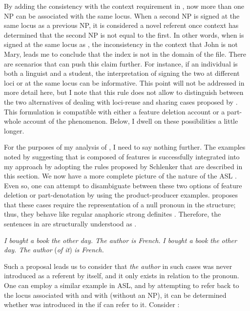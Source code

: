 \documentclass[output=paper,
modfonts
]{langscibook}
\begin{document}
By adding the consistency with the context requirement in , now more than one NP can be associated with the same locus. When a second NP is signed at the same locus as a previous NP, it is considered a novel referent once context has determined that the second NP is not equal to the first. In other words, when  is signed at the same locus as , the inconsistency in the context that John is not Mary, leads me to conclude that the index is not in the domain of the file. There are scenarios that can push this claim further. For instance, if an individual is both a linguist and a student, the interpretation of signing the two at different loci or at the same locus can be informative. This point will not be addressed in more detail here, but I note that this rule does not allow to distinguish between the two alternatives of dealing with loci-reuse and sharing cases proposed by \citeauthor{Schlenker2014}. This formulation is compatible with either a feature deletion account or a part-whole account of the phenomenon. Below, I dwell on these possibilities a little longer. 

For the purposes of my analysis of , I need to say nothing further. The examples noted by \citeauthor{Kuhn2015} suggesting that  is composed of features is successfully integrated into my approach by adopting the rules proposed by Schlenker that are described in this section. We now have a more complete picture of the nature of the ASL . Even so, one can attempt to disambiguate between these two options of feature deletion or part-denotation by using the product-producer  examples. \citet{Schwarz2009} proposes that these cases require the representation of a null pronoun in the structure; thus, they behave like regular anaphoric strong definites \citep[268]{Schwarz2009}. Therefore, the sentences in  are structurally understood as . 

\begin{exe}
	\ex 
	\begin{xlist} 
		\ex \label{ex:irani:81a} \textit{I bought a book the other day. The author is French.}
		\ex \label{ex:irani81b} \textit{I bought a book the other day. The author} (\textit{of it}) \textit{is French.}
	\end{xlist} 
\end{exe}

Such a proposal leads us to consider that \textit{the author} in such cases was never introduced as a referent by itself, and it only exists in relation to the pronoun. One can employ a similar example in ASL, and by attempting to refer back to the locus associated with  and  with  (without an NP), it can be determined whether  was introduced in the  if  can refer to it. Consider :
\end{document}
